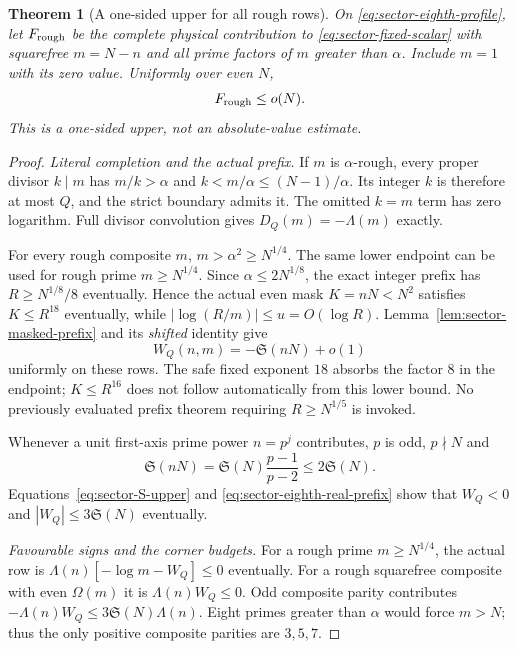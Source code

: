 \documentclass[11pt,a4paper]{article}
\newtheorem{theorem}{Theorem}[section]
\theoremstyle{definition}
\theoremstyle{remark}
\begin{document}
\begin{theorem}[A one-sided upper for all rough rows]
\label{thm:eighth-rough}
On \eqref{eq:sector-eighth-profile}, let $F_{\rm rough}$ be the
complete physical contribution to \eqref{eq:sector-fixed-scalar}
with squarefree $m=N-n$ and all prime factors of $m$ greater than
$\alpha$.  Include $m=1$ with its zero value.  Uniformly over even
$N$,
\begin{equation}
                         F_{\rm rough}\leq o(N).
 \label{eq:sector-all-rough-upper}
\end{equation}
This is a one-sided upper, not an absolute-value estimate.
\end{theorem}
\begin{proof}
\emph{Literal completion and the actual prefix.}
If $m$ is $\alpha$-rough, every proper divisor $k\mid m$ has
$m/k>\alpha$ and $k<m/\alpha\leq(N-1)/\alpha$.  Its integer
$k$ is therefore at most $Q$, and the strict boundary admits it.
The omitted $k=m$ term has zero logarithm.  Full divisor
convolution gives $D_Q(m)=-\Lambda(m)$ exactly.

For every rough composite $m$, $m>\alpha^2\geq N^{1/4}$.
The same lower endpoint can be used for rough prime $m\geq N^{1/4}$.
Since $\alpha\leq2N^{1/8}$, the exact integer prefix has
$R\geq N^{1/8}/8$ eventually.  Hence the actual even mask
$K=nN<N^2$ satisfies $K\leq R^{18}$ eventually, while
$|\log(R/m)|\leq u=O(\log R)$.  Lemma~\ref{lem:sector-masked-prefix}
and its \emph{shifted} identity give
\begin{equation}
                 W_Q(n,m)=-\mathfrak S(nN)+o(1)
 \label{eq:sector-eighth-real-prefix}
\end{equation}
uniformly on these rows.  The safe fixed exponent $18$ absorbs
the factor $8$ in the endpoint; $K\leq R^{16}$ does not follow
automatically from this lower bound.  No previously evaluated
prefix theorem requiring $R\geq N^{1/5}$ is invoked.

Whenever a unit first-axis prime power $n=p^j$ contributes,
$p$ is odd, $p\nmid N$ and
\[
 \mathfrak S(nN)=\mathfrak S(N)\frac{p-1}{p-2}
                            \leq2\mathfrak S(N).
\]
Equations~\eqref{eq:sector-S-upper} and
\eqref{eq:sector-eighth-real-prefix} show that $W_Q<0$ and
$|W_Q|\leq3\mathfrak S(N)$ eventually.

\emph{Favourable signs and the corner budgets.}
For a rough prime $m\geq N^{1/4}$, the actual row is
$\Lambda(n)[-\log m-W_Q]\leq0$ eventually.  For a rough
squarefree composite with even $\Omega(m)$ it is
$\Lambda(n)W_Q\leq0$.  Odd composite parity contributes
$-\Lambda(n)W_Q\leq3\mathfrak S(N)\Lambda(n)$.
Eight primes greater than $\alpha$ would force $m>N$; thus
the only positive composite parities are $3,5,7$.


\end{proof}
\end{document}
